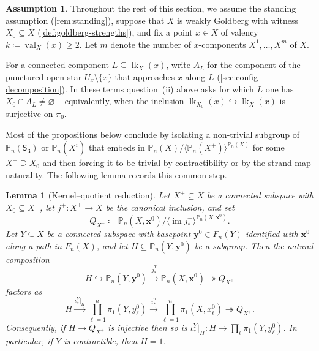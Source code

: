 \documentclass[reqno]{amsart}
\newtheorem{lemma}[theorem]{Lemma}
\theoremstyle{definition}
\newtheorem{assumption}[theorem]{Assumption}
\newcommand\bfx{\mathbf{x}}
\newcommand\bfy{\mathbf{y}}
\newcommand\sfS{\mathsf{S}}
\newcommand{\PB}{\mathbb{P}}
\newcommand{\im}{\operatorname{im}}
\newcommand{\co}[1]{\mathopen{\langle}#1\mathclose{\rangle}} %
\newcommand{\base}{\bfx^0}
\DeclareMathOperator{\lk}{lk}
\DeclareMathOperator{\val}{val}
\numberwithin{equation}{section}
\begin{document}
\begin{assumption}
Throughout the rest of this section, we assume the standing
assumption (\cref{rem:standing}), suppose that \(X\) is
weakly Goldberg with witness \(X_0\subseteq X\)
(\cref{def:goldberg-strengths}), and fix a point
\(x\in X\) of valency \(k\coloneqq\val_X(x)\geq 2\).
Let \(m\) denote the number of \(x\)-components \(X^1,\dots,X^m\) of \(X\).
\end{assumption}

For a connected component \(L\subseteq\lk_X(x)\), write \(A_L\) for
the component of the punctured open star \(U_x\setminus\{x\}\) that
approaches \(x\) along \(L\) (\cref{sec:config-decomposition}). In
these terms question~(ii) above asks for which \(L\) one has
\(X_0\cap A_L\neq\varnothing\) -- equivalently, when the inclusion
\(\lk_{X_0}(x)\hookrightarrow\lk_X(x)\) is surjective on \(\pi_0\).

Most of the propositions below conclude by
isolating a non-trivial subgroup of \(\PB_n(\sfS_3)\) or
\(\PB_n(X^i)\) that embeds in
\(\PB_n(X)/\co{\PB_n(X^+)}^{\PB_n(X)}\) for some
\(X^+\supseteq X_0\) and then forcing it to be trivial by contractibility
or by the strand-map naturality. The following lemma records this
common step.

\begin{lemma}[Kernel--quotient reduction]\label{lem:kernel-quotient-reduction}
Let \(X^+\subseteq X\) be a connected
subspace with \(X_0\subseteq X^+\), let \(j^+\colon X^+\to X\) be the canonical inclusion, and set
\[
Q_{X^+}\coloneqq
\PB_n(X,\base)\big/\co{\im j^+_*}^{\PB_n(X,\base)}.
\]
Let \(Y\subseteq X\) be a connected subspace with basepoint
\(\bfy^0\in F_n(Y)\) identified with \(\base\) along a path in
\(F_n(X)\), and let \(H\subseteq\PB_n(Y,\bfy^0)\) be a subgroup.
Then the natural composition
\[
H\hookrightarrow\PB_n(Y,\bfy^0)
\xrightarrow{j_\ast^Y}\PB_n(X,\base)
\twoheadrightarrow Q_{X^+}
\]
factors as
\[
H\xrightarrow{\iota_\ast^Y|_H}
\prod_{\ell=1}^{n}\pi_1(Y,y_\ell^0)
\xrightarrow{i_\ast^n}
\prod_{\ell=1}^{n}\pi_1(X,x_\ell^0)
\twoheadrightarrow Q_{X^+}.
\]
Consequently, if \(H\to Q_{X^+}\) is injective then so is
\(\iota_\ast^Y|_H\colon H\to\prod_\ell\pi_1(Y,y_\ell^0)\). In particular,
if \(Y\) is contractible, then \(H=1\).
\end{lemma}
\end{document}
